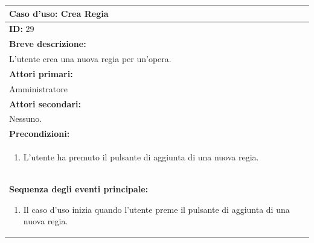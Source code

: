 \documentclass{article}
\begin{document}
                \begin{table}[H]
                    \begin{tabular}{|p{\linewidth}|}
                        \hline
                        \cellcolor{gray!100}
                        \color{white}
                        \centerline{\textbf{Caso d'uso:} Crea Regia} \\
                        \hline
                        \textbf{ID:} 29 \\
                        \hline
                        \cellcolor{gray!20}
                        \textbf{Breve descrizione:} \\
                        \cellcolor{gray!20}
                        L'utente crea una nuova regia per un'opera. \\
                        \hline
                        \textbf{Attori primari:} \\
                        \begin{minipage}{\linewidth}
                            Amministratore
                        \end{minipage}
                        \vspace{-10pt} \\  %
                        \hline
                        \textbf{Attori secondari:} \\
                        Nessuno. \\
                        \hline
                        \cellcolor{gray!20}
                        \textbf{Precondizioni:} \\
                        \cellcolor{gray!20}
                        \begin{minipage}{\linewidth}
                            \begin{enumerate}
                                \item L'utente ha premuto il pulsante di aggiunta di una nuova regia.
                            \end{enumerate}
                        \end{minipage} \\
                        \hline
                        \textbf{Sequenza degli eventi principale:}
                        \begin{enumerate}
                            \item Il caso d'uso inizia quando l'utente preme il pulsante di aggiunta di una nuova regia.

\end{enumerate}
\end{tabular}
\end{table}
\end{document}
